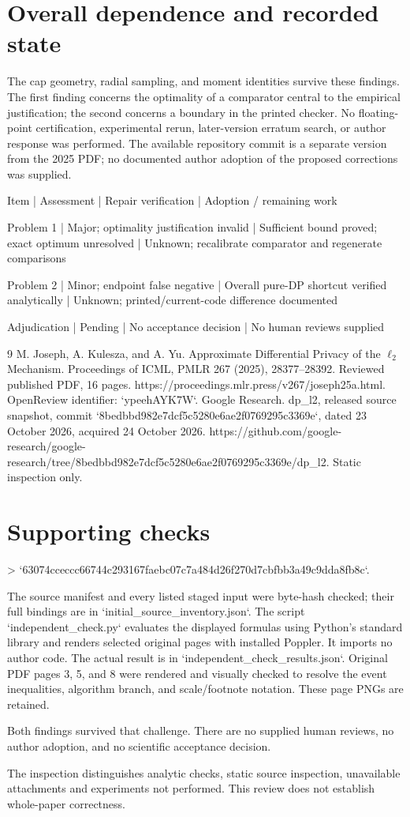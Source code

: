 \documentclass[10pt]{article}
\begin{document}
\section*{Overall dependence and recorded state}
The cap geometry, radial sampling, and moment identities survive these findings. The first finding concerns the optimality of a comparator central to the empirical justification; the second concerns a boundary in the printed checker. No floating-point certification, experimental rerun, later-version erratum search, or author response was performed. The available repository commit is a separate version from the 2025 PDF; no documented author adoption of the proposed corrections was supplied.\par
Item | Assessment | Repair verification | Adoption / remaining work\par
Problem 1 | Major; optimality justification invalid | Sufficient bound proved; exact optimum unresolved | Unknown; recalibrate comparator and regenerate comparisons\par
Problem 2 | Minor; endpoint false negative | Overall pure-DP shortcut verified analytically | Unknown; printed/current-code difference documented\par
Adjudication | Pending | No acceptance decision | No human reviews supplied\par
9 M. Joseph, A. Kulesza, and A. Yu. Approximate Differential Privacy of the \(\ell_2\) Mechanism. Proceedings of ICML, PMLR 267 (2025), 28377–28392. Reviewed published PDF, 16 pages. https://proceedings.mlr.press/v267/joseph25a.html. OpenReview identifier: `ypeehAYK7W`. Google Research. dp\_l2, released source snapshot, commit `8bedbbd982e7dcf5c5280e6ae2f0769295c3369e`, dated 23 October 2026, acquired 24 October 2026. https://github.com/google-research/google-research/tree/8bedbbd982e7dcf5c5280e6ae2f0769295c3369e/dp\_l2. Static inspection only.\par
\section*{Supporting checks}
> `63074cceccc66744c293167faebc07c7a484d26f270d7cbfbb3a49c9dda8fb8c`.\par
The source manifest and every listed staged input were byte-hash checked; their full bindings are in `initial\_source\_inventory.json`. The script `independent\_check.py` evaluates the displayed formulas using Python’s standard library and renders selected original pages with installed Poppler. It imports no author code. The actual result is in `independent\_check\_results.json`. Original PDF pages 3, 5, and 8 were rendered and visually checked to resolve the event inequalities, algorithm branch, and scale/footnote notation. These page PNGs are retained.\par
Both findings survived that challenge. There are no supplied human reviews, no author adoption, and no scientific acceptance decision.\par
The inspection distinguishes analytic checks, static source inspection, unavailable attachments and experiments not performed. This review does not establish whole-paper correctness.\par
\end{document}
